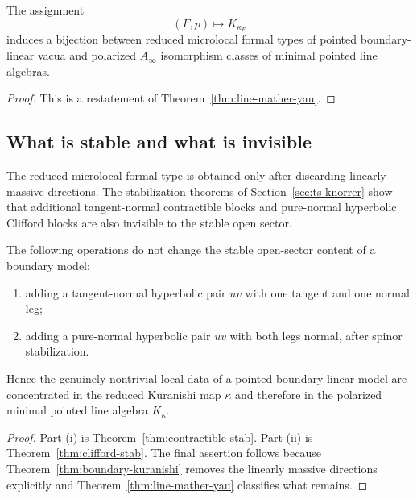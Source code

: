 \begin{corollary}%
The assignment
\[
(F,p)\longmapsto K_{\kappa_F}
\]
induces a bijection between reduced microlocal formal types of pointed boundary-linear vacua and polarized $A_\infty$ isomorphism classes of minimal pointed line algebras.
\end{corollary}

\begin{proof}
This is a restatement of Theorem~\ref{thm:line-mather-yau}.
\end{proof}

\subsection{What is stable and what is invisible}

The reduced microlocal formal type is obtained only after discarding linearly massive directions. The stabilization theorems of Section~\ref{sec:ts-knorrer} show that additional tangent-normal contractible blocks and pure-normal hyperbolic Clifford blocks are also invisible to the stable open sector.

\begin{corollary}%
The following operations do not change the stable open-sector content of a boundary model:
\begin{enumerate}[label=(\roman*),leftmargin=1.8em]
\item adding a tangent-normal hyperbolic pair $u v$ with one tangent and one normal leg;
\item adding a pure-normal hyperbolic pair $uv$ with both legs normal, after spinor stabilization.
\end{enumerate}
Hence the genuinely nontrivial local data of a pointed boundary-linear model are concentrated in the reduced Kuranishi map $\kappa$ and therefore in the polarized minimal pointed line algebra $K_\kappa$.
\end{corollary}

\begin{proof}
Part (i) is Theorem~\ref{thm:contractible-stab}. Part (ii) is Theorem~\ref{thm:clifford-stab}. The final assertion follows because Theorem~\ref{thm:boundary-kuranishi} removes the linearly massive directions explicitly and Theorem~\ref{thm:line-mather-yau} classifies what remains.
\end{proof}


